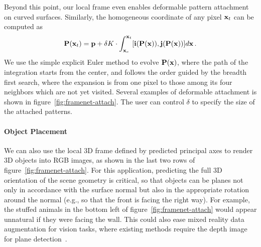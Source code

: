 Beyond this point, our local frame even enables deformable pattern attachment on curved surfaces. Similarly, the homogeneous coordinate of any pixel $\mathbf{x}_t$ can be computed as
\begin{equation}
    \mathbf{P}(\mathbf{x}_t)=\mathbf{p} + \delta K \cdot\int_{\mathbf{x}_c}^{\mathbf{x}_t} [\textbf{i}(\mathbf{P}(\mathbf{x})),\textbf{j}(\mathbf{P}(\mathbf{x}))] d\mathbf{x}\,.
\end{equation}
We use the simple explicit Euler method to evolve $\mathbf{P}(\mathbf{x})$, where the path of the integration starts from the center, and follows the order guided by the breadth first search, where the expansion is from one pixel to those among its four neighbors which are not yet visited. Several examples of deformable attachment is shown in figure~\ref{fig:framenet-attach}. The user can control $\delta$ to specify the size of the attached patterns.

\vspace{-0.1in}
\paragraph{Object Placement} We can also use the local 3D frame defined by predicted principal axes to render 3D objects into RGB images, as shown in the last two rows of figure~\ref{fig:framenet-attach}.  For this application, predicting the full 3D orientation of the scene geometry is critical, so that objects can be planes not only in accordance with the surface normal but also in the appropriate rotation around the normal (e.g., so that the front is facing the right way).   For example, the stuffed animals in the bottom left of figure~\ref{fig:framenet-attach} would appear unnatural if they were facing the wall. This could also ease mixed reality data augmentation for vision tasks, where existing methods require the depth image for plane detection~\cite{wang2019normalized}.

